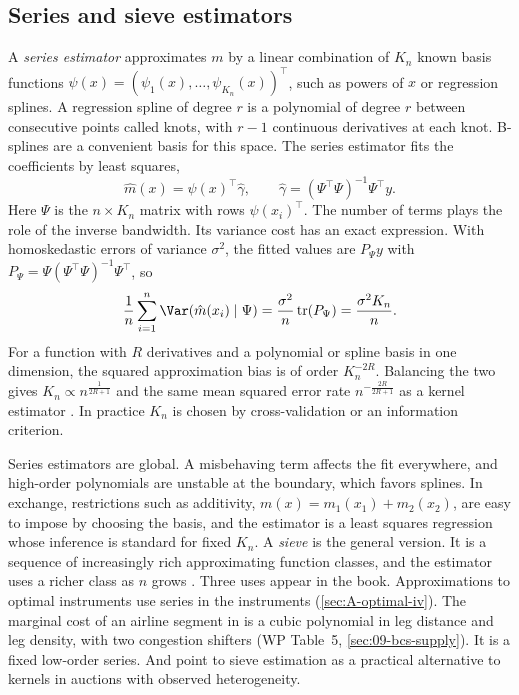 \subsection{Series and sieve estimators}\label{sec:A-series}

A \emph{series estimator} approximates $m$ by a linear combination of $K_n$ known basis functions
$\psi(x)=(\psi_1(x),\dots,\psi_{K_n}(x))^\top$, such as powers of $x$ or regression splines. A regression
spline of degree $r$ is a polynomial of degree $r$ between consecutive points called knots, with $r-1$ continuous
derivatives at each knot. B-splines are a convenient basis for this space. The series estimator fits the
coefficients by least squares,
\begin{equation}\label{eq:A-series}
\hat m(x)=\psi(x)^\top\hat\gamma,\qquad \hat\gamma=(\Psi^\top\Psi)^{-1}\Psi^\top y .
\end{equation}
Here $\Psi$ is the $n\times K_n$ matrix with rows $\psi(x_i)^\top$. The number of terms plays the role of
the inverse bandwidth. Its variance cost has an exact expression. With homoskedastic errors of variance
$\sigma^2$, the fitted values are $P_\Psi y$ with $P_\Psi=\Psi(\Psi^\top\Psi)^{-1}\Psi^\top$, so
\begin{equation*}
\frac{1}{n}\sum_{i=1}^{n}\Var(\hat m(x_i)\mid\Psi)=\frac{\sigma^2}{n}\,\mathrm{tr}(P_\Psi)=\frac{\sigma^2K_n}{n}.
\end{equation*}
For a function with $R$ derivatives and a polynomial or spline basis in one dimension, the squared
approximation bias is of order $K_n^{-2R}$. Balancing the two gives $K_n\propto n^{\frac{1}{2R+1}}$ and the
same mean squared error rate $n^{-\frac{2R}{2R+1}}$ as a kernel estimator \citep{Newey1997}. In practice
$K_n$ is chosen by cross-validation or an information criterion.

Series estimators are global. A misbehaving term affects the fit everywhere, and high-order
polynomials are unstable at the boundary, which favors splines. In exchange, restrictions such as
additivity, $m(x)=m_1(x_1)+m_2(x_2)$, are easy to impose by choosing the basis, and the estimator is a
least squares regression whose inference is standard for fixed $K_n$. A \emph{sieve} is the general
version. It is a sequence of increasingly rich approximating function classes, and the estimator uses a richer
class as $n$ grows \citep{Chen2007}. Three uses appear in
the book. Approximations to optimal instruments use series in the instruments (\cref{sec:A-optimal-iv}).
The marginal cost of an airline segment in \citet{BerryCarnallSpiller1996} is a cubic polynomial in leg
distance and leg density, with two congestion shifters (WP Table~5, \cref{sec:09-bcs-supply}). It is a
fixed low-order series. And
\citet[footnote~20]{AtheyHaile2007} point to sieve estimation as a practical alternative to kernels
in auctions with observed heterogeneity.

